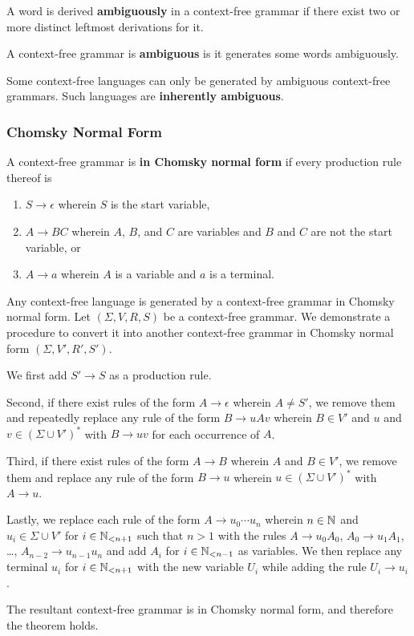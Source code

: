 \Bdf
    A word is derived {\bf ambiguously} in a context-free grammar if there exist
    two or more distinct leftmost derivations for it.

    A context-free grammar is {\bf ambiguous} is it generates some words
    ambiguously.
\Edf

Some context-free languages can only be generated by ambiguous context-free
grammars. Such languages are {\bf inherently ambiguous}.

\subsubsection{Chomsky Normal Form}

\Bdf
    A context-free grammar is {\bf in Chomsky normal form} if every production
    rule thereof is
    \begin{enumerate}
        \item \(S \to \epsilon\) wherein \(S\) is the start variable,
        \item \(A \to B C\) wherein \(A\), \(B\), and \(C\) are variables and
        \(B\) and \(C\) are not the start variable, or
        \item \(A \to a\) wherein \(A\) is a variable and \(a\) is a terminal.
    \end{enumerate}
\Edf

\Bth
    Any context-free language is generated by a context-free grammar in Chomsky
    normal form.
\Eth
\Bpr
    Let \((\Sigma, V, R, S)\) be a context-free grammar. We demonstrate a
    procedure to convert it into another context-free grammar in Chomsky normal
    form \((\Sigma, V', R', S')\).

    We first add \(S' \to S\) as a production rule.

    Second, if there exist rules of the form \(A \to \epsilon\) wherein \(A \neq
    S'\), we remove them and repeatedly replace any rule of the form \(B \to u A
    v\) wherein \(B \in V'\) and \(u\) and \(v \in (\Sigma \cup V')^*\) with \(B
    \to u v\) for each occurrence of \(A\).

    Third, if there exist rules of the form \(A \to B\) wherein \(A\) and \(B
    \in V'\), we remove them and replace any rule of the form \(B \to u\)
    wherein \(u \in (\Sigma \cup V')^*\) with \(A \to u\).

    Lastly, we replace each rule of the form \(A \to u_0 \cdots u_n\) wherein
    \(n \in \setnat\) and \(u_i \in \Sigma \cup V'\) for \(i \in \Nln[n + 1]\)
    such that \(n > 1\) with the rules \(A \to u_0 A_0\), \(A_0 \to u_1 A_1\),
    \ldots, \(A_{n - 2} \to u_{n - 1} u_n\) and add \(A_i\) for \(i \in \Nln[n -
    1]\) as variables. We then replace any terminal \(u_i\) for \(i \in \Nln[n +
    1]\) with the new variable \(U_i\) while adding the rule \(U_i \to u_i\).

    The resultant context-free grammar is in Chomsky normal form, and therefore
    the theorem holds.
\Epr

\Edc
